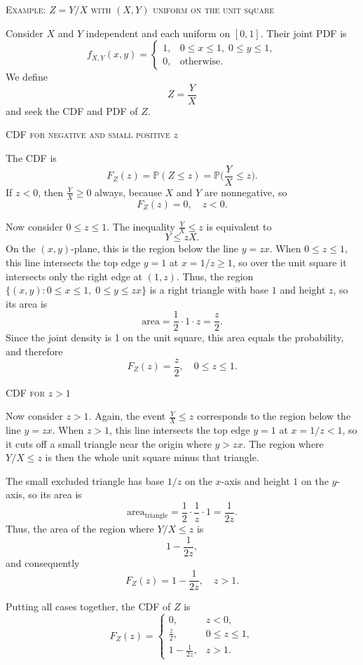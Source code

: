 \textsc{Example: \(Z = Y/X\) with \((X,Y)\) uniform on the unit square}

Consider \(X\) and \(Y\) independent and each uniform on \([0,1]\).  
Their joint PDF is
\[
f_{X,Y}(x,y)
=
\begin{cases}
1, & 0 \le x \le 1,\; 0 \le y \le 1,\\[4pt]
0, & \text{otherwise}.
\end{cases}
\]
We define
\[
Z = \frac{Y}{X}
\]
and seek the CDF and PDF of \(Z\).

\textsc{CDF for negative and small positive \(z\)}

The CDF is
\[
F_Z(z)
=
\mathbb{P}(Z \le z)
=
\mathbb{P}\Big(\frac{Y}{X} \le z\Big).
\]
If \(z<0\), then \(\frac{Y}{X} \ge 0\) always, because \(X\) and \(Y\) are nonnegative, so
\[
F_Z(z) = 0, \quad z<0.
\]

Now consider \(0 \le z \le 1\).  
The inequality \(\frac{Y}{X} \le z\) is equivalent to
\[
Y \le zX.
\]
On the \((x,y)\)-plane, this is the region below the line \(y = zx\).  
When \(0 \le z \le 1\), this line intersects the top edge \(y=1\) at \(x = 1/z \ge 1\), so over the unit square it intersects only the right edge at \((1,z)\).  
Thus, the region \(\{(x,y): 0 \le x \le 1,\; 0 \le y \le z x\}\) is a right triangle with base \(1\) and height \(z\), so its area is
\[
\text{area} = \frac{1}{2}\cdot 1 \cdot z = \frac{z}{2}.
\]
Since the joint density is 1 on the unit square, this area equals the probability, and therefore
\[
F_Z(z) = \frac{z}{2}, \quad 0 \le z \le 1.
\]

\textsc{CDF for \(z>1\)}

Now consider \(z>1\).  
Again, the event \(\frac{Y}{X}\le z\) corresponds to the region below the line \(y = z x\).  
When \(z>1\), this line intersects the top edge \(y=1\) at \(x = 1/z < 1\), so it cuts off a small triangle near the origin where \(y > z x\).  
The region where \(Y/X \le z\) is then the whole unit square minus that triangle.

The small excluded triangle has base \(1/z\) on the \(x\)-axis and height \(1\) on the \(y\)-axis, so its area is
\[
\text{area}_{\text{triangle}}
=
\frac{1}{2}\cdot \frac{1}{z}\cdot 1
=
\frac{1}{2z}.
\]
Thus, the area of the region where \(Y/X \le z\) is
\[
1 - \frac{1}{2z},
\]
and consequently
\[
F_Z(z)
=
1 - \frac{1}{2z},
\quad z>1.
\]

Putting all cases together, the CDF of \(Z\) is
\[
F_Z(z)
=
\begin{cases}
0, & z<0,\\[4pt]
\displaystyle \frac{z}{2}, & 0 \le z \le 1,\\[6pt]
\displaystyle 1 - \frac{1}{2z}, & z>1.
\end{cases}
\]

